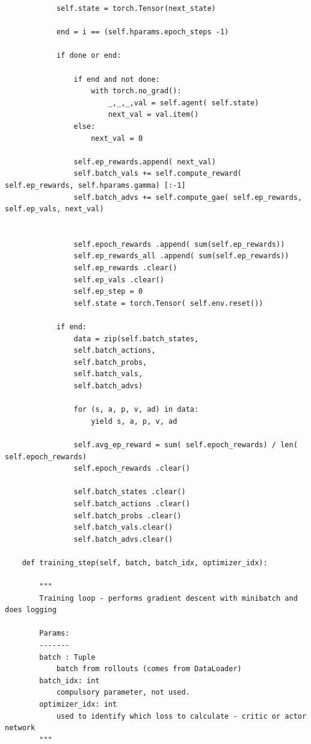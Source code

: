 \documentclass[12pt]{article}
\begin{document}
\begin{addmargin}[-4em]{-4em}
\begin{multicols}{2}
\begin{verbatim}
            self.state = torch.Tensor(next_state)
            
            end = i == (self.hparams.epoch_steps -1)

            if done or end:
                
                if end and not done:
                    with torch.no_grad():
                        _,_,_,val = self.agent( self.state)
                        next_val = val.item()
                else:
                    next_val = 0
                
                self.ep_rewards.append( next_val)
                self.batch_vals += self.compute_reward( self.ep_rewards, self.hparams.gamma) [:-1]
                self.batch_advs += self.compute_gae( self.ep_rewards, self.ep_vals, next_val)
                

                self.epoch_rewards .append( sum(self.ep_rewards))
                self.ep_rewards_all .append( sum(self.ep_rewards))
                self.ep_rewards .clear()
                self.ep_vals .clear()
                self.ep_step = 0
                self.state = torch.Tensor( self.env.reset())
                
            if end:
                data = zip(self.batch_states,
                self.batch_actions,
                self.batch_probs,
                self.batch_vals,
                self.batch_advs)

                for (s, a, p, v, ad) in data:
                    yield s, a, p, v, ad
                    
                self.avg_ep_reward = sum( self.epoch_rewards) / len( self.epoch_rewards)
                self.epoch_rewards .clear()
                
                self.batch_states .clear()
                self.batch_actions .clear()
                self.batch_probs .clear()
                self.batch_vals.clear()
                self.batch_advs.clear()
    
    def training_step(self, batch, batch_idx, optimizer_idx):

        """
        Training loop - performs gradient descent with minibatch and does logging

        Params:
        -------
        batch : Tuple
            batch from rollouts (comes from DataLoader)
        batch_idx: int
            compulsory parameter, not used. 
        optimizer_idx: int
            used to identify which loss to calculate - critic or actor network
        """
        

\end{verbatim}
\end{multicols}
\end{addmargin}
\end{document}

